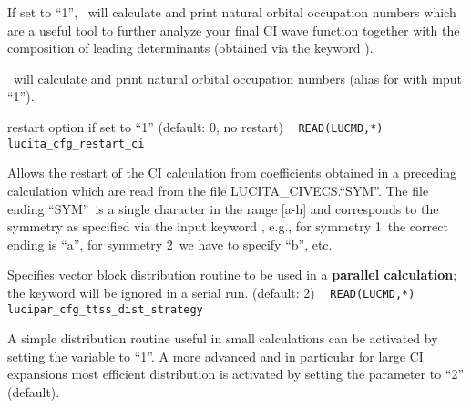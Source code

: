\begin{description}
If set to ``1'', \lucita\ will calculate and print natural orbital occupation numbers which are a useful tool to further analyze 
your final CI wave function together with the composition of leading determinants (obtained via the keyword ).

\item[\Key{NATORB}] \lucita\ will calculate and print natural orbital occupation numbers (alias for  with input ``1'').\verb| |\newline

\item[\Key{RSTART}] restart option if set to ``1'' (default: 0, no restart) \verb| |\newline
\verb|READ(LUCMD,*) lucita_cfg_restart_ci |

Allows the restart of the CI calculation from coefficients obtained 
in a preceding calculation which are read from the file LUCITA\_CIVECS.``SYM''. 
The file ending ``SYM''\ is a single character in the range [a-h] and 
corresponds to the symmetry as specified via the input keyword , e.g., 
for symmetry 1\ the correct ending is ``a'', for symmetry 2\ we have to specify ``b'', etc.

\item[\Key{DISTRT}] Specifies vector block distribution routine to be used in a {\bf{parallel calculation}}; the keyword will be ignored in a serial run. (default: 2) \verb| |\newline
\verb|READ(LUCMD,*) lucipar_cfg_ttss_dist_strategy |

A simple distribution routine useful in small calculations 
can be activated by setting the variable to ``1''. A more advanced and in particular for large CI expansions most 
efficient distribution is activated by setting the parameter to ``2'' (default).

\end{description}
